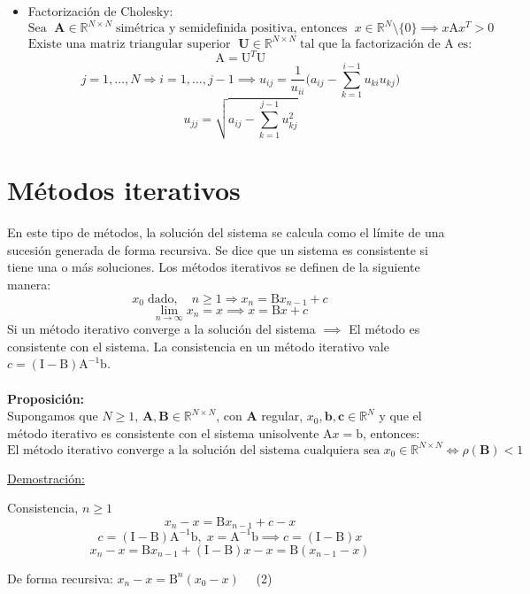 \documentclass{article}
\begin{document}
\hrulefill

\begin{itemize}
\item Factorización de Cholesky:
$$\text{Sea }\;\textbf{A}\in\mathbb{R}^{N\times N}\;\text{simétrica y semidefinida positiva, entonces }\;x\in\mathbb{R}^N\setminus\{0\}\implies x\text{A}x^T>0$$
$$\text{Existe una matriz triangular superior }\;\textbf{U}\in\mathbb{R}^{N\times N}\;\text{tal que la factorización de A es:}$$
$$\text{A}=\text{U}^T\text{U}$$
$$j=1,\dots,N\Rightarrow i=1,\dots,j-1\implies u_{ij}=\frac{1}{u_{ii}}\bigg(a_{ij}-\sum_{k=1}^{i-1}u_{ki}u_{kj}\bigg)$$
$$u_{jj}=\sqrt{a_{ij}-\sum_{k=1}^{j-1}u_{kj}^2}$$
\end{itemize}
%
%
\section{Métodos iterativos}

En este tipo de métodos, la solución del sistema se calcula como el límite de una sucesión generada de forma recursiva. Se dice que un sistema es consistente si tiene una o más soluciones. Los métodos iterativos se definen de la siguiente manera:
$$x_0\;\text{dado},\quad n\geq 1\Rightarrow x_n=\text{B}x_{n-1}+c$$
$$\lim_{n\to\infty}x_n=x\implies x=\text{B}x+c$$
Si un método iterativo converge a la solución del sistema $\implies$ El método es consistente con el sistema. La consistencia en un método iterativo vale $c=(\text{I}-\text{B})\text{A}^{-1}\text{b}$.
\\
\\
\textbf{Proposición:}
\\
Supongamos que $N\geq 1$, $\textbf{A},\textbf{B}\in\mathbb{R}^{N\times N}$, con \textbf{A} regular, $x_0,\textbf{b},\textbf{c}\in\mathbb{R}^N$ y que el método iterativo es consistente con el sistema unisolvente $\text{A}x=\text{b}$, entonces:
$$\text{El método iterativo converge a la solución del sistema cualquiera sea}\;x_0\in\mathbb{R}^{N\times N}\iff\rho(\textbf{B})<1$$

\hrulefill

\underline{Demostración:}

Consistencia, $n\geq 1$
$$x_n-x=\text{B}x_{n-1}+c-x$$
$$c=(\text{I}-\text{B})\text{A}^{-1}\text{b},\;x=\text{A}^{-1}\text{b}\implies c=(\text{I}-\text{B})x$$
$$x_n-x=\text{B}x_{n-1}+(\text{I}-\text{B})x-x=\text{B}(x_{n-1}-x)$$

De forma recursiva: $x_n-x=\text{B}^n(x_0-x)\quad$ (2)
\end{document}
